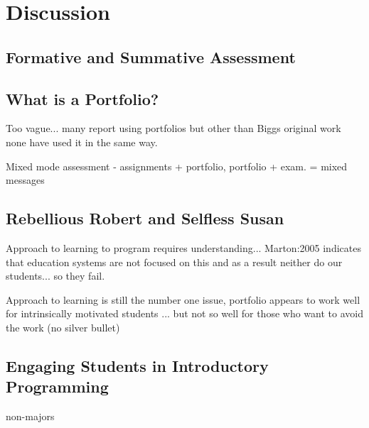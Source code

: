 
\chapter{Discussion} %
\label{cha:discussion}

\section{Formative and Summative Assessment} %
\label{sec:formative_and_summative_assessment}


\section{What is a Portfolio?} %
\label{sec:what_is_a_portfolio_}

Too vague... many report using portfolios but other than Biggs original work none have used it in the same way.


Mixed mode assessment - assignments + portfolio, portfolio + exam.
= mixed messages


\section{Rebellious Robert and Selfless Susan} %
\label{sec:rebellious_robert_and_selfless_susan}

Approach to learning to program requires understanding... Marton:2005 indicates that education systems are not focused on this and as a result neither do our students... so they fail.

Approach to learning is still the number one issue, portfolio appears to work well for intrinsically motivated students ... but not so well for those who want to avoid the work (no silver bullet)


\section{Engaging Students in Introductory Programming} %
\label{sec:engaging_students_in_introductory_programming}


\citet{Guzdial:2005} non-majors


